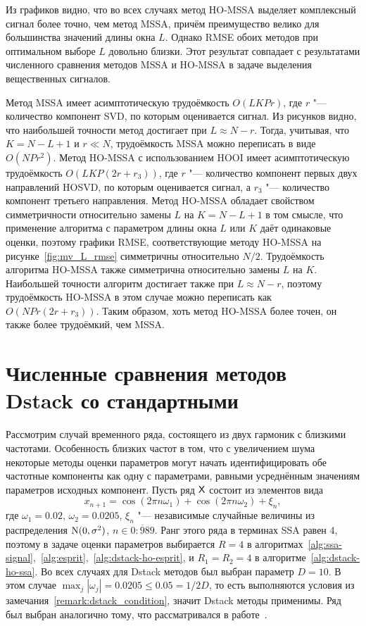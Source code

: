 \documentclass[specialist,
  substylefile=spbu_report.rtx,
subf,href,colorlinks=true, 12pt]{disser}
\theoremstyle{plain}
\theoremstyle{definition}
\theoremstyle{remark}
\begin{document}
Из графиков видно, что во всех случаях метод HO-MSSA выделяет
комплексный сигнал более точно, чем метод MSSA,
причём преимущество велико для большинства значений длины окна $L$.
Однако RMSE обоих методов при оптимальном выборе $L$ довольно близки.
Этот результат совпадает с результатами численного сравнения методов MSSA и
HO-MSSA в задаче выделения вещественных сигналов.

Метод MSSA имеет асимптотическую трудоёмкость $O(LKPr)$, где
$r$ "--- количество компонент SVD, по которым оценивается сигнал.
Из рисунков видно, что наибольшей точности метод достигает при
$L \approx N-r$.
Тогда, учитывая, что $K=N - L + 1$ и $r\ll N$, трудоёмкость MSSA
можно переписать в виде $O(NPr^2)$.
Метод HO-MSSA с использованием HOOI имеет асимптотическую
трудоёмкость $O(LKP(2r+r_3))$, где $r$ "--- количество
компонент первых двух направлений HOSVD,
по которым оценивается сигнал, а $r_3$ "--- количество компонент
третьего направления.
Метод HO-MSSA обладает свойством симметричности относительно
замены $L$ на $K=N-L+1$ в том смысле, что применение алгоритма
с параметром длины окна $L$ или $K$ даёт одинаковые оценки,
поэтому графики RMSE, соответствующие методу HO-MSSA
на рисунке~\ref{fig:mv_L_rmse} симметричны относительно $N/2$.
Трудоёмкость алгоритма HO-MSSA также симметрична относительно
замены $L$ на $K$.
Наибольшей точности алгоритм достигает также при
$L\approx N - r$, поэтому трудоёмкость HO-MSSA в этом случае можно переписать
как $O(NPr(2r+r_3))$.
Таким образом, хоть метод HO-MSSA более точен, он также более
трудоёмкий, чем MSSA.

\section{Численные сравнения методов Dstack со
стандартными}\label{sec:dstack-comparison}
Рассмотрим случай временного ряда, состоящего из двух гармоник с
близкими частотами.
Особенность близких частот в том, что с увеличением шума некоторые
методы оценки параметров могут начать идентифицировать обе частотные
компоненты как одну с параметрами, равными усреднённым значениям
параметров исходных компонент.
Пусть ряд $\mathsf{X}$ состоит
из элементов вида
\[
  x_{n + 1} = \cos\left(2 \pi n \omega_1\right) + \cos\left(2 \pi n
  \omega_2\right) + \xi_n,
\]
где $\omega_1 = 0.02$, $\omega_2 = 0.0205$, $\xi_n$ "--- независимые
случайные величины из распределения $\mathrm{N}(0, \sigma^2)$, $n \in
\overline{0:989}$.
Ранг этого ряда в терминах SSA равен 4, поэтому в задаче оценки
параметров выбирается $R=4$ в
алгоритмах~\ref{alg:ssa-signal},~\ref{alg:esprit},~\ref{alg:dstack-ho-esprit},
и $R_1=R_2 = 4$ в алгоритме~\ref{alg:dstack-ho-ssa}.
Во всех случаях для Dstack методов был выбран параметр $D=10$.
В этом случае $\max_j |\omega_j| = 0.0205 \leqslant 0.05 = 1 / 2D$,
то есть выполняются условия из замечания~\ref{remark:dstack_condition},
значит Dstack методы применимы.
Ряд был выбран аналогично тому, что рассматривался в работе~\cite{Papy2009}.
\end{document}
